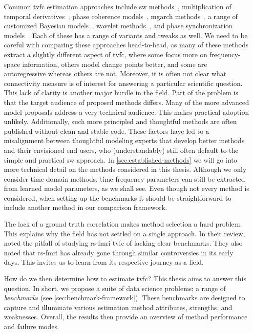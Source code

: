Common \gls{tvfc} estimation approaches include \gls{sw} methods~\parencite{Sakoglu2010, Chang2010}, multiplication of temporal derivatives~\parencite{Shine2015}, phase coherence models~\parencite{Glerean2012}, \gls{mgarch} methods~\parencite{Lindquist2014, Choe2017, Xie2019}, a range of customized Bayesian models~\parencite[see e.g.][]{Taghia2017, Lan2017, Warnick2018, Li2019b, Ebrahimi2020}, wavelet methods~\parencite{Park2014, Zhang2016}, and phase synchronization models~\parencite{Varela2001, Glerean2012, Demirtas2016, Honari2021}.
Each of these has a range of variants and tweaks as well.
We need to be careful with comparing these approaches head-to-head, as many of these methods extract a slightly different aspect of \gls{tvfc}, where some focus more on frequency-space information, others model change points better, and some are autoregressive whereas others are not.
Moreover, it is often not clear what connectivity measure is of interest for answering a particular scientific question.
This lack of clarity is another major hurdle in the field.
%
Part of the problem is that the target audience of proposed methods differs.
Many of the more advanced model proposals address a very technical audience.
This makes practical adoption unlikely.
Additionally, such more principled and thoughtful methods are often published without clean and stable code.
These factors have led to a misalignment between thoughtful modeling experts that develop better methods and their envisioned end users, who (understandably) still often default to the simple and practical \gls{sw} approach.
%
In \cref{sec:established-methods} we will go into more technical detail on the methods considered in this thesis.
%
Although we only consider time domain methods, time-frequency parameters can still be extracted from learned model parameters, as we shall see.
Even though not every method is considered, when setting up the benchmarks it should be straightforward to include another method in our comparison framework.

The lack of a ground truth correlation makes method selection a hard problem.
This explains why the field has not settled on a single approach.
%
In their review, \textcite{Lurie2020} noted the pitfall of studying \gls{rs-fmri} \gls{tvfc} of lacking clear benchmarks.
They also noted that \gls{rs-fmri} has already gone through similar controversies in its early days.
This invites us to learn from its respective journey as a field.

How do we then determine how to estimate \gls{tvfc}?
This thesis aims to answer this question.
In short, we propose a suite of data science problems; a range of \emph{benchmarks} (see \cref{sec:benchmark-framework}).
These benchmarks are designed to capture and illuminate various estimation method attributes, strengths, and weaknesses.
Overall, the results then provide an overview of method performance and failure modes.
